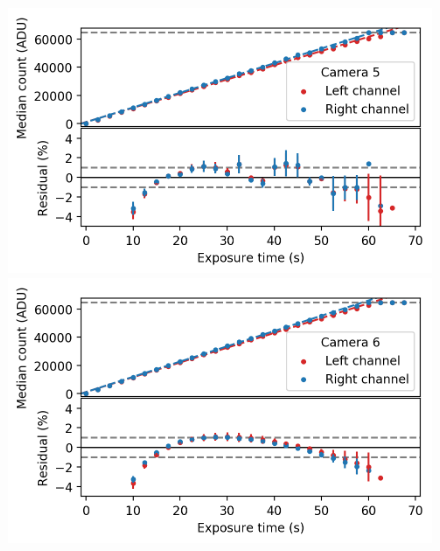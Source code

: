 \begin{colsection}
\begin{figure}[p]
\begin{center}
        \begin{minipage}[t]{0.47\linewidth}\vspace{10pt}
            \includegraphics[width=\linewidth]{images/detectors/lin_5.png}
        \end{minipage}
        \begin{minipage}[t]{0.47\linewidth}\vspace{10pt}
            \includegraphics[width=\linewidth]{images/detectors/lin_6.png}
        \end{minipage}


\end{center}
\end{figure}
\end{colsection}

